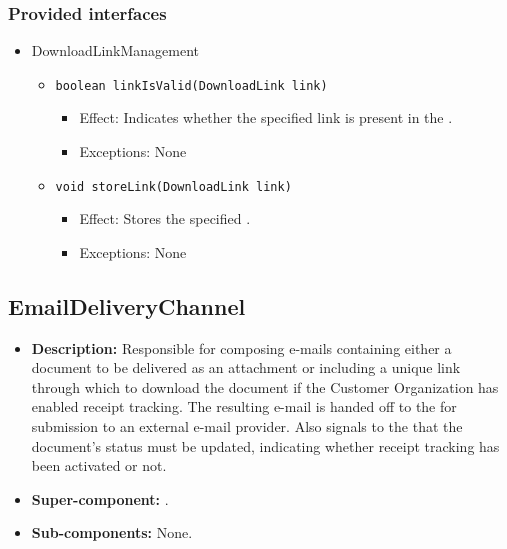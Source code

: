 \subsubsection*{Provided interfaces}
\begin{itemize}
    \item DownloadLinkManagement
    \begin{itemize}
        \item \texttt{boolean linkIsValid(DownloadLink link)}
        \begin{itemize}
            \item Effect: Indicates whether the specified link is present in the .
            \item Exceptions: None
        \end{itemize}

        \item \texttt{void storeLink(DownloadLink link)}
		    \begin{itemize}
                \item Effect: Stores the specified .
                \item Exceptions: None
            \end{itemize}
    \end{itemize}
\end{itemize}

\subsection{EmailDeliveryChannel}
\begin{itemize}
    \item \textbf{Description:} Responsible for composing e-mails containing either a document to be delivered as an attachment or including a unique link through which to download the document if the Customer Organization has enabled receipt tracking. The resulting e-mail is handed off to the  for submission to an external e-mail provider. Also signals to the  that the document's status must be updated, indicating whether receipt tracking has been activated or not.
    \item \textbf{Super-component:} .
    \item \textbf{Sub-components:} None.
\end{itemize}

